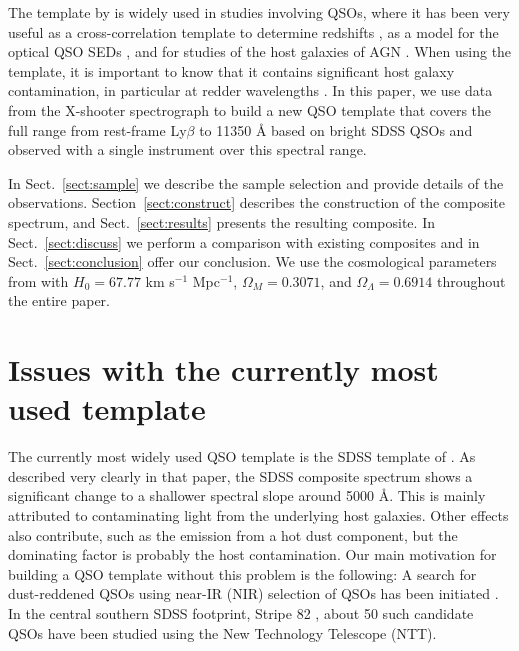 \documentclass{aa}    %
\newcommand{\sectionname}{Sect.}
\newcommand{\Sect}[1]{\sectionname~\ref{sect:#1}}
\newcommand{\sect}[1]{\Sect{#1}}
\newcommand{\sectionnamei}{Section}
\newcommand{\Secti}[1]{\sectionnamei~\ref{sect:#1}}
\newcommand{\secti}[1]{\Secti{#1}}
\newcommand{\sectlabel}[1]{\label{sect:#1}}
\begin{document}
The template by \citet{VandenBerk2001} is widely used in studies
involving QSOs, where it has been very useful as a cross-correlation
template to determine redshifts \citep{Stoughton2002, Rafiee2011}, as
a model for the optical QSO SEDs \citep{Croom2004, Hopkins2006,
  Hopkins2007}, and for studies of the host galaxies of AGN
\citep{Kauffmann2003b}. When using the \citet{VandenBerk2001} template,
it is important to know that it contains significant host galaxy
contamination, in particular at redder wavelengths \citep[e.g.,][their
  Fig.~5]{Fynbo2013}.  In this paper, we use data from the X-shooter
spectrograph to build a new QSO template that covers the full range
from rest-frame Ly$\beta$ to 11350 {\AA} based on bright SDSS QSOs and
observed with a single instrument over this spectral range. 

In \sect{sample} we describe the sample selection and provide details
of the observations. \secti{construct} describes the construction of
the composite spectrum, and \sect{results} presents the resulting
composite. In \sect{discuss} we perform a comparison with existing
composites and in \sect{conclusion} offer our conclusion. We use the
cosmological parameters from \citet{Planck2014} with $H_{0} = 67.77$
km s$^{-1}$ Mpc$^{-1}$, $\Omega_{M} = 0.3071$, and $\Omega_{\Lambda} =
0.6914$ throughout the entire paper.




\section{Issues with the currently most used template}   \sectlabel{problem}

The currently most widely used QSO template is the SDSS template of
\citet{VandenBerk2001}. As described very clearly in that paper, the
SDSS composite spectrum shows a significant change to a shallower
spectral slope around 5000 \AA. This is mainly attributed to
contaminating light from the underlying host galaxies. Other effects
also contribute, such as the emission from a hot dust component, but the
dominating factor is probably the host contamination. Our main
motivation for building a QSO template without this problem is the
following: A search for dust-reddened QSOs using
near-IR (NIR) selection of QSOs has been initiated \citep{Fynbo2013, Krogager2015}. 
In the central southern SDSS footprint, Stripe 82 \citep{Annis2014}, about 50 such candidate QSOs have been studied using the
New Technology Telescope (NTT). 
\end{document}
